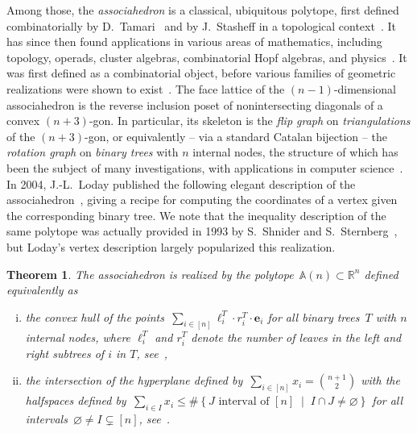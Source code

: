 \documentclass{amsart}
\newtheorem{theorem}{Theorem}%
\theoremstyle{definition}
\newcommand{\R}{\mathbb{R}} %
\renewcommand{\b}[1]{{\boldsymbol{#1}}} %
\newcommand{\set}[2]{\left\{ #1 \;\middle|\; #2 \right\}} %
\newcommand{\darkblue}{\color{darkblue}} %
\newcommand{\defn}[1]{\textsl{\darkblue #1}} %
\newcommand{\polytope}[1]{\mathds{#1}} %
\newcommand{\Asso}{\polytope{A}} %
\begin{document}
Among those, the \defn{associahedron} is a classical, ubiquitous polytope, first defined combinatorially by D.~Tamari~\cite{T51} and by J.~Stasheff in a topological context~\cite{S63}.
It has since then found applications in various areas of mathematics, including topology, operads, cluster algebras, combinatorial Hopf algebras, and physics~\cite{PilaudSantosZiegler}.
It was first defined as a combinatorial object, before various families of geometric realizations were shown to exist~\cite{MR1022776,MR1941227,MR2108555,MR3437894}.
The face lattice of the $(n-1)$-dimensional associahedron is the reverse inclusion poset of nonintersecting diagonals of a convex $(n+3)$-gon.
In particular, its skeleton is the \defn{flip graph} on \defn{triangulations} of the $(n+3)$-gon, or equivalently -- via a standard Catalan bijection -- the \defn{rotation graph} on \defn{binary trees} with $n$ internal nodes, the structure of which has been the subject of many investigations, with applications in computer science~\cite{MR928904,MR3197650}.
In 2004, J.-L.~Loday published the following elegant description of the associahedron~\cite{MR2108555}, giving a recipe for computing the coordinates of a vertex given the corresponding binary tree.
We note that the inequality description of the same polytope was actually provided in 1993 by S.~Shnider and S.~Sternberg~\cite{ShniderSternberg}, but Loday's vertex description largely popularized this realization.

\begin{theorem}
  \label{thm:loday}
  The associahedron is realized by the polytope~$\Asso (n) \subset \R^n$ defined equivalently as
  \begin{enumerate}[(i)]
  \item the convex hull of the points~$\sum_{i\in [n]} \ell^T_i\cdot r^T_i \cdot \b{e}_i$ for all binary trees~$T$ with $n$ internal nodes, where $\ell^T_i$ and $r^T_i$ denote the number of leaves in the left and right subtrees of $i$ in $T$, see~\cite{MR2108555},
  \item the intersection of the hyperplane defined by~$\sum_{i \in [n]} x_i = \binom{n+1}{2}$ with the halfspaces defined by~$\sum_{i \in I} x_i \le \#\set{J \text{ interval of } [n]}{I \cap J \ne \varnothing}$ for all intervals~$\varnothing \ne I \subsetneq [n]$, see~\cite{ShniderSternberg}.
  \end{enumerate}
\end{theorem}
\end{document}
